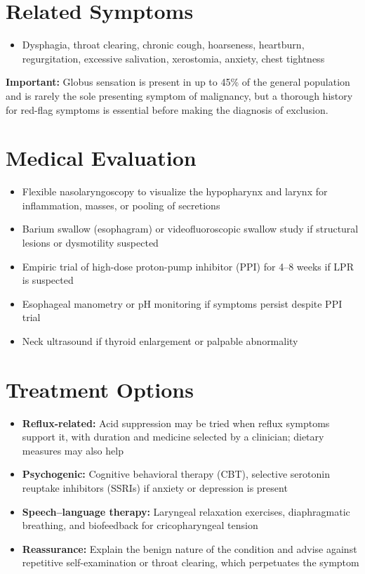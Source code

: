 \section*{Related Symptoms}
\begin{itemize}
  \item Dysphagia, throat clearing, chronic cough, hoarseness, heartburn, regurgitation, excessive salivation, xerostomia, anxiety, chest tightness
\end{itemize}
\textbf{Important:} Globus sensation is present in up to 45\% of the general population and is rarely the sole presenting symptom of malignancy, but a thorough history for red-flag symptoms is essential before making the diagnosis of exclusion.

\section*{Medical Evaluation}
\begin{itemize}
  \item Flexible nasolaryngoscopy to visualize the hypopharynx and larynx for inflammation, masses, or pooling of secretions
  \item Barium swallow (esophagram) or videofluoroscopic swallow study if structural lesions or dysmotility suspected
  \item Empiric trial of high-dose proton-pump inhibitor (PPI) for 4--8 weeks if LPR is suspected
  \item Esophageal manometry or pH monitoring if symptoms persist despite PPI trial
  \item Neck ultrasound if thyroid enlargement or palpable abnormality
\end{itemize}

\section*{Treatment Options}
\begin{itemize}
  \item \textbf{Reflux-related:} Acid suppression may be tried when reflux symptoms support it, with duration and medicine selected by a clinician; dietary measures may also help
  \item \textbf{Psychogenic:} Cognitive behavioral therapy (CBT), selective serotonin reuptake inhibitors (SSRIs) if anxiety or depression is present
  \item \textbf{Speech--language therapy:} Laryngeal relaxation exercises, diaphragmatic breathing, and biofeedback for cricopharyngeal tension
  \item \textbf{Reassurance:} Explain the benign nature of the condition and advise against repetitive self-examination or throat clearing, which perpetuates the symptom
\end{itemize}

